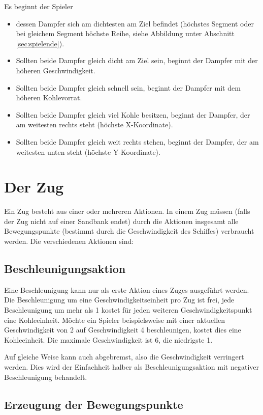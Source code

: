 \documentclass[12pt,a4paper, ngerman, oneside]{scrartcl}
\begin{document}
Es beginnt der Spieler

\begin{itemize}
\item dessen Dampfer sich am dichtesten am Ziel befindet (höchstes Segment oder bei gleichem Segment höchste Reihe, siehe Abbildung unter Abschnitt \ref{sec:spielende}).
\item Sollten beide Dampfer gleich dicht am Ziel sein, beginnt der Dampfer mit der höheren Geschwindigkeit.
\item Sollten beide Dampfer gleich schnell sein, beginnt der Dampfer mit dem höheren Kohlevorrat.
\item Sollten beide Dampfer gleich viel Kohle besitzen, beginnt der Dampfer, der am weitesten rechts steht (höchste X-Koordinate).
\item Sollten beide Dampfer gleich weit rechts stehen, beginnt der Dampfer, der am weitesten unten steht (höchste Y-Koordinate).
\end{itemize}

\section{Der Zug}

Ein Zug besteht aus einer oder mehreren Aktionen. In einem Zug
müssen (falls der Zug nicht auf einer Sandbank endet) durch die Aktionen
insgesamt alle Bewegungspunkte (bestimmt durch die Geschwindigkeit des Schiffes)
verbraucht werden. Die verschiedenen Aktionen sind:


\subsection{\label{acceleration}Beschleunigungsaktion}

Eine Beschleunigung kann nur als erste Aktion eines Zuges ausgeführt werden. Die
Beschleunigung um eine Geschwindigkeitseinheit pro Zug ist frei, jede
Beschleunigung um mehr als 1 kostet für jeden weiteren Geschwindigkeitspunkt
eine Kohleeinheit. Möchte ein Spieler beispielsweise mit einer aktuellen
Geschwindigkeit von 2 auf Geschwindigkeit 4 beschleunigen, kostet dies eine
Kohleeinheit. Die maximale Geschwindigkeit ist 6, die niedrigste 1.

Auf gleiche Weise kann auch abgebremst, also die Geschwindigkeit verringert
werden. Dies wird der Einfachheit halber als Beschleunigungsaktion mit negativer
Beschleunigung behandelt.

\subsection{Erzeugung der Bewegungspunkte}
\end{document}
